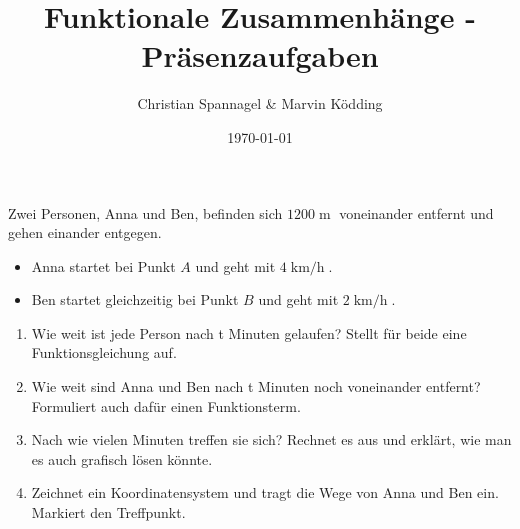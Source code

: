 \documentclass{cssheet}
\title{Funktionale Zusammenhänge - Präsenzaufgaben}
\author{Christian Spannagel \& Marvin Ködding}
\date{\today}
\begin{document}
\printtitle

\begin{aufgabe} 
	Zwei Personen, Anna und Ben, befinden sich $1200\operatorname{m}$ voneinander entfernt und gehen einander entgegen.
	
\begin{itemize}
\item Anna startet bei Punkt $A$ und geht mit $4\operatorname{km/h}$.
\item Ben startet gleichzeitig bei Punkt $B$ und geht mit $2\operatorname{km/h}$.
\end{itemize}
	
\begin{enumerate}[a]
\item Wie weit ist jede Person nach t Minuten gelaufen? Stellt für beide eine Funktionsgleichung auf.
\item Wie weit sind Anna und Ben nach t Minuten noch voneinander entfernt? Formuliert auch dafür einen Funktionsterm.
\item Nach wie vielen Minuten treffen sie sich? Rechnet es aus und erklärt, wie man es auch grafisch lösen könnte.
\item Zeichnet ein Koordinatensystem und tragt die Wege von Anna und Ben ein. Markiert den Treffpunkt.
\end{enumerate}

\end{aufgabe}
	
\vspace*{5mm}
\printlicense
\printsocials
\end{document}
